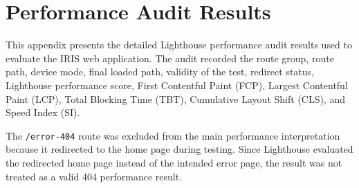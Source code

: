 \chapter{Performance Audit Results}
\label{app:performance-audit-results}

This appendix presents the detailed Lighthouse performance audit results used to evaluate the IRIS web application. The audit recorded the route group, route path, device mode, final loaded path, validity of the test, redirect status, Lighthouse performance score, First Contentful Paint (FCP), Largest Contentful Paint (LCP), Total Blocking Time (TBT), Cumulative Layout Shift (CLS), and Speed Index (SI).

The \texttt{/error-404} route was excluded from the main performance interpretation because it redirected to the home page during testing. Since Lighthouse evaluated the redirected home page instead of the intended error page, the result was not treated as a valid 404 performance result.

